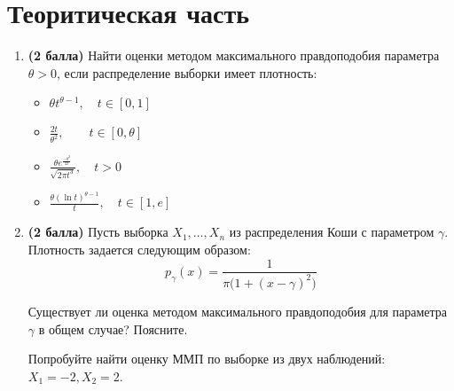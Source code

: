 \documentclass{assignment}
\begin{document}

\section*{Теоритическая часть}
\begin{enumerate}
    \item \textbf{(2 балла)} Найти оценки методом максимального правдоподобия параметра $\theta > 0$, если распределение выборки имеет плотность:
    \begin{itemize}
        \item $\theta t^{\theta - 1}, \quad t \in [0, 1]$
        \item $\displaystyle \frac{2t}{\theta^2},\quad \quad  t \in [0, \theta]$
        \item $\displaystyle \frac{\theta e^{\frac{-\theta^2}{2t}}}{\sqrt{2 \pi t^3}}, \quad t > 0$
        \item $\displaystyle \frac{\theta (\ln{t})^{\theta - 1}}{t}, \quad t \in [1, e]$
    \end{itemize}

    \item \textbf{(2 балла)} Пусть выборка $X_1, \ldots, X_n$ из  распределения Коши с параметром $\gamma$. 
    Плотность задается следующим образом:
    $$
    p_{\gamma}(x) = \frac{1}{\pi \big(1 + (x - \gamma)^2\big)}
    $$

    Существует ли оценка методом максимального правдоподобия для параметра $\gamma$ в общем случае? Поясните.

    Попробуйте найти оценку ММП по выборке из двух наблюдений: $X_1 = -2, X_2 = 2$.
\end{enumerate}
    
\end{document}
